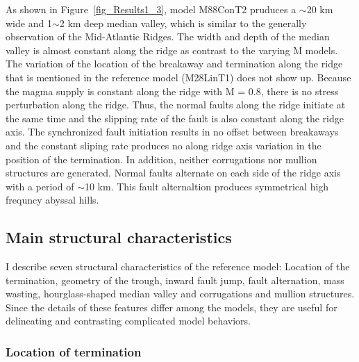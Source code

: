 As shown in Figure~\hyperref[fig_Results1_3]{\ref{fig_Results1_3}}, model M88ConT2 pruduces a $\sim$20 km wide and 1$\sim$2 km deep median valley, which is similar to the generally observation of the Mid-Atlantic Ridges. The width and depth of the median valley is almost constant along the ridge as contrast to the varying M models. The variation of the location of the breakaway and termination along the ridge that is mentioned in the reference model (M28LinT1) does not show up. Because the magma supply is constant along the ridge with M = 0.8, there is no stress perturbation along the ridge. Thus, the normal faults along the ridge initiate at the same time and the slipping rate of the fault is also constant along the ridge axis. The synchronized fault initiation results in no offset between breakaways and the constant sliping rate produces no along ridge axis variation in the position of the termination. In addition, neither corrugations nor mullion structures are generated. Normal faults alternate on each side of the ridge axis with a period of $\sim$10 km. This fault alternaltion produces symmetrical high frequncy abyssal hills.

\subsection{Main structural characteristics}
I describe seven structural characteristics of the reference model: Location of the termination, geometry of the trough, inward fault jump, fault alternation, mass wasting, hourglass-shaped median valley and corrugations and mullion structures. Since the details of these features differ among the models, they are useful for delineating and contrasting complicated model behaviors.

\subsubsection{Location of termination}

